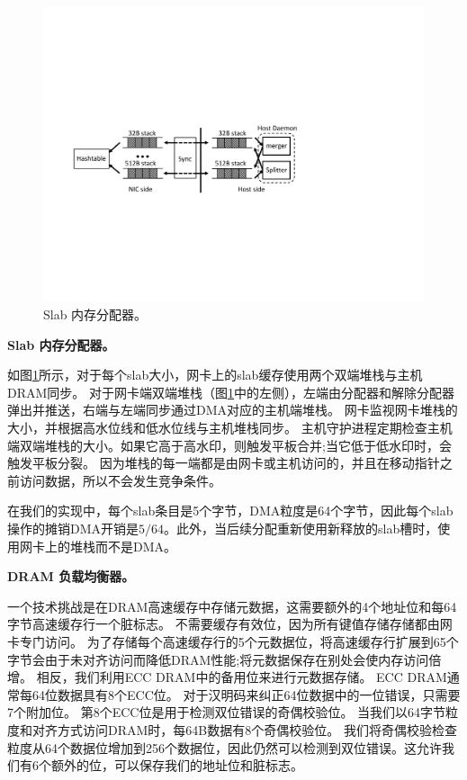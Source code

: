 \begin{figure}[t]
\centering
\includegraphics[width=.8\textwidth,page=1]{figure/cropped_slab.pdf}
\caption{Slab 内存分配器。}
\label{kvdirect:fig:slab}

\end{figure}

\textbf {Slab 内存分配器。}

如图\ref {kvdirect:fig:slab}所示，对于每个slab大小，网卡上的slab缓存使用两个双端堆栈与主机DRAM同步。
对于网卡端双端堆栈（图\ref {kvdirect:fig:slab}中的左侧），左端由分配器和解除分配器弹出并推送，右端与左端同步通过DMA对应的​​主机端堆栈。
网卡监视网卡堆栈的大小，并根据高水位线和低水位线与主机堆栈同步。
主机守护进程定期检查主机端双端堆栈的大小。如果它高于高水印，则触发平板合并;当它低于低水印时，会触发平板分裂。
因为堆栈的每一端都是由网卡或主机访问的，并且在移动指针之前访问数据，所以不会发生竞争条件。

在我们的实现中，每个slab条目是5个字节，DMA粒度是64个字节，因此每个slab操作的摊销DMA开销是$ 5/64 $。此外，当后续分配重新使用新释放的slab槽时，使用网卡上的堆栈而不是DMA。


\textbf{DRAM 负载均衡器。}

一个技术挑战是在DRAM高速缓存中存储元数据，这需要额外的4个地址位和每64字节高速缓存行一个脏标志。
不需要缓存有效位，因为所有键值存储存储都由网卡专门访问。
为了存储每个高速缓存行的5个元数据位，将高速缓存行扩展到65个字节会由于未对齐访问而降低DRAM性能;将元数据保存在别处会使内存访问倍增。
相反，我们利用ECC DRAM中的备用位来进行元数据存储。
ECC DRAM通常每64位数据具有8个ECC位。
对于汉明码来纠正64位数据中的一位错误，只需要7个附加位。
第8个ECC位是用于检测双位错误的奇偶校验位。
当我们以64字节粒度和对齐方式访问DRAM时，每64B数据有8个奇偶校验位。
我们将奇偶校验检查粒度从64个数据位增加到256个数据位，因此仍然可以检测到双位错误。这允许我们有6个额外的位，可以保存我们的地址位和脏标志。

